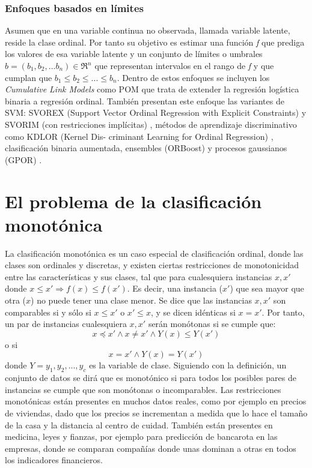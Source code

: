 \subsubsection{Enfoques basados en límites}
Asumen que en una variable continua no observada, llamada variable latente, reside la clase ordinal. Por tanto su objetivo es estimar una función \textit{f} que prediga los valores de esa variable latente y un conjunto de límites o umbrales $b= (b_1,b_2,...b_n) \in \Re^n$ que representan intervalos en el rango de \textit{f} y que cumplan que $b_1 \le b_2 \le ... \le b_n$. Dentro de estos enfoques se incluyen los \textit{Cumulative Link Models} como POM \cite{mccullagh1980regression} que trata de extender la regresión logística binaria a regresión ordinal. También presentan este enfoque las variantes de SVM: SVOREX (Support Vector Ordinal Regression with
Explicit Constraints) y SVORIM (con restricciones implícitas) \cite{chu2007support}, métodos de aprendizaje discriminativo como KDLOR (Kernel Dis-
criminant Learning for Ordinal Regression) \cite{sun2010kernel}, clasificación binaria aumentada, ensembles (ORBoost) \cite{lin2006large} y procesos gaussianos (GPOR) \cite{chu2005gaussian}.
\section{El problema de la clasificación monotónica}
La clasificación monotónica es un caso especial de clasificación ordinal, donde las clases son ordinales y discretas, y existen ciertas restricciones de monotonicidad entre las características y sus clases, tal que para cualesquiera instancias $x, x'$ donde $x \le x' \Rightarrow f(x) \le f(x')$. Es decir, una instancia ($x'$) que sea mayor que otra ($x$) no puede tener una clase menor. Se dice que las instancias $x, x'$ son comparables si y sólo si $x \leq x'$ o $x' \leq x$, y se dicen idénticas si $x=x'$. Por tanto, un par de instancias cualesquiera $x,x'$ serán monótonas si se cumple que: 
$$ x \preceq x' \land x \neq x' \land Y(x) \leq Y(x')$$ o si $$x=x' \land Y(x)=Y(x')$$ donde $Y={y_1,y_2,...,y_c}$ es la variable de clase. \newline
Siguiendo con la definición, un conjunto de datos se dirá que es monotónico si para todos los posibles pares de instancias se cumple que son monótonas o incomparables. \newline
Las restricciones monotónicas están presentes en muchos datos reales, como por ejemplo en precios de viviendas, dado que los precios se incrementan a medida que lo hace el tamaño de la casa y la distancia al centro de cuidad. También están presentes en medicina, leyes y fianzas, por ejemplo para predicción de bancarota en las empresas, donde se comparan compañías donde unas dominan a otras en todos los indicadores financieros.
